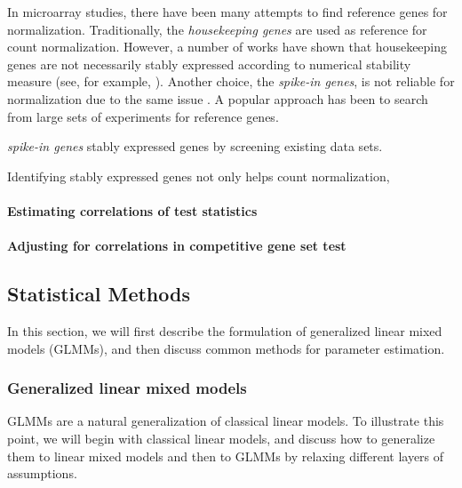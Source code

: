 	In microarray studies, there have been many attempts to find reference genes for normalization. Traditionally, the \textit{housekeeping genes}  are used as reference for count normalization. However, a number of works have shown that housekeeping genes are not necessarily stably expressed according to numerical stability measure (see, for example, \cite{huggett2005real, czechowski2005genome}). Another choice, the \textit{spike-in genes}, is not reliable for normalization due to the same issue \citep{risso2014nat}. A popular approach has been to search from large sets of experiments for reference genes.   
	
	\textit{spike-in genes}  
	stably expressed genes by screening existing data sets. 
	
	Identifying stably expressed genes not only helps count normalization, 
	\paragraph{Estimating correlations of test statistics}
	
	\paragraph{Adjusting for correlations in competitive gene set test}
	
	
\subsection{Statistical Methods}\label{subsec:glmm}
	In this section, we will first describe the formulation of generalized linear mixed models (GLMMs), and then discuss common methods for parameter estimation.
	
	\subsubsection{Generalized linear mixed models}\label{subsubsec:intro-stat-framework}
	GLMMs are a natural generalization of classical linear models. To illustrate this point, we will begin with classical linear models, and discuss how to generalize them to linear mixed models and then to GLMMs by relaxing different layers of assumptions. 
